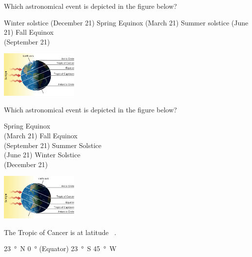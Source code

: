 \documentclass[addpoints]{exam}
\begin{document}
\begin{questions}
\question
Which astronomical event is depicted in the figure below?

\begin{minipage}{0.4\textwidth}
    \centering
    \begin{choices}
    \choice Winter solstice (December 21)
    \choice Spring Equinox (March 21)
    \correctchoice Summer solstice (June 21)
    \choice Fall Equinox\\ (September 21)
    \end{choices}
\end{minipage}%
\begin{minipage}{0.5\textwidth}
    \centering
    \includegraphics[width=1.5in]{Figures/Figure4.8.jpg}
\end{minipage}
\vspace{1em}

\question
Which astronomical event is depicted in the figure below?

\begin{minipage}{0.45\textwidth}
    \centering
    \begin{choices}
    \choice Spring Equinox\\ (March 21)
    \choice Fall Equinox\\ (September 21)
    \choice Summer Solstice\\ (June 21)
    \correctchoice Winter Solstice\\ (December 21)
    \end{choices}
\end{minipage}%
\begin{minipage}{0.5\textwidth}
    \centering
    \includegraphics[width=1.5in]{Figures/Figure4.9.jpg}
\end{minipage}
\vspace{1em}

\question
The Tropic of Cancer is at latitude \fillin[][1cm]\ .

\begin{choices}
    \correctchoice \SI{23}{\degree N}
    \choice \SI{0}{\degree} (Equator)
    \correctchoice \SI{23}{\degree S}
    \correctchoice \SI{45}{\degree W}
\end{choices}


\end{questions}
\end{document}

